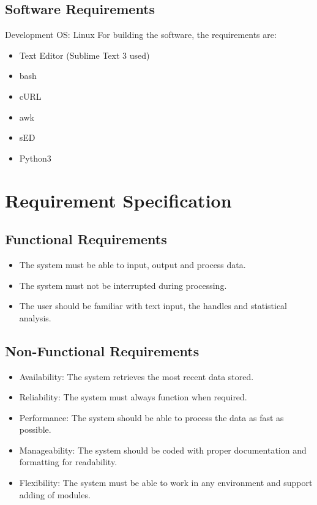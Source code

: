 \documentclass[12pt,a4paper]{report}
\begin{document}
\subsection{Software Requirements}
Development OS: Linux
For building the software, the requirements are:
\begin{itemize}[itemsep=0em]
	\item Text Editor (Sublime Text 3 used)
	\item bash
	\item cURL
	\item awk
	\item sED
	\item Python3
\end{itemize}

\section{Requirement Specification}
\subsection{Functional Requirements}
\begin{itemize}[itemsep=0em]
	\item The system must be able to input, output and process data.
	\item The system must not be interrupted during processing.
	\item The user should be familiar with text input, the handles and statistical analysis.
\end{itemize}
\subsection{Non-Functional Requirements}
\begin{itemize}[itemsep=0em]
	\item Availability: The system retrieves the most recent data stored.
	\item Reliability: The system must always function when required.
	\item Performance: The system should be able to process the data as fast as possible.
	\item Manageability: The system should be coded with proper documentation and formatting for readability.
	\item Flexibility: The system must be able to work in any environment and support adding of modules.
\end{itemize}
\end{document}
